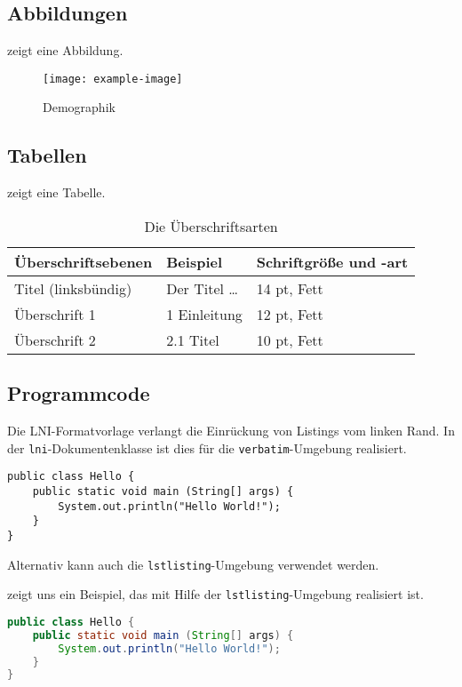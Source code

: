 \documentclass[utf8,biblatex]{lni}
\begin{document}
\subsection{Abbildungen}
 zeigt eine Abbildung.

\begin{figure}
  \centering
  \texttt{[image: example-image]}
  \caption{Demographik}
  \label{fig:demo}
\end{figure}

\subsection{Tabellen}
 zeigt eine Tabelle.

\begin{table}
\centering
\begin{tabular}{lll}
\toprule
Überschriftsebenen & Beispiel & Schriftgröße und -art \\
\midrule
Titel (linksbündig) & Der Titel \ldots & 14 pt, Fett\\
Überschrift 1 & 1 Einleitung & 12 pt, Fett\\
Überschrift 2 & 2.1 Titel & 10 pt, Fett\\
\bottomrule
\end{tabular}
\caption{Die Überschriftsarten}
\label{tab:demo}
\end{table}

\subsection{Programmcode}
Die LNI-Formatvorlage verlangt die Einrückung von Listings vom linken Rand.
In der \texttt{lni}-Dokumentenklasse ist dies für die \texttt{verbatim}-Umgebung realisiert.

\begin{verbatim}
public class Hello {
    public static void main (String[] args) {
        System.out.println("Hello World!");
    }
}
\end{verbatim}

Alternativ kann auch die \texttt{lstlisting}-Umgebung verwendet werden.

 zeigt uns ein Beispiel, das mit Hilfe der \texttt{lstlisting}-Umgebung realisiert ist.

\begin{lstlisting}[caption={Beschreibung}, label=L1, language=Java]
public class Hello {
    public static void main (String[] args) {
        System.out.println("Hello World!");
    }
}
\end{lstlisting}
\end{document}
